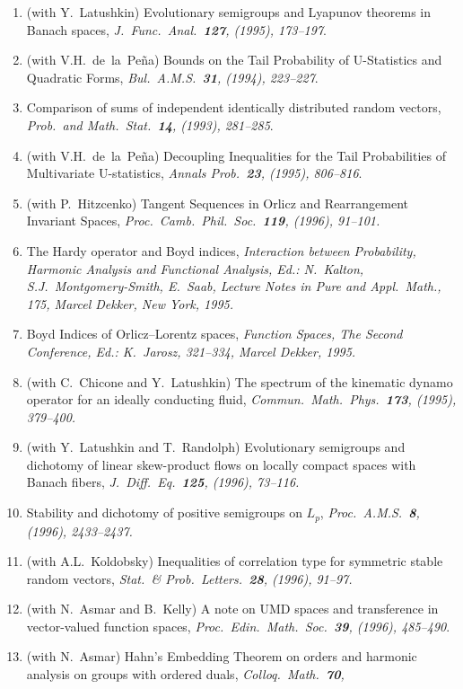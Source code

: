 \documentclass{article}
\begin{document}
\begin{enumerate}
\item (with Y.~Latushkin) Evolutionary semigroups and Lyapunov theorems
in Banach spaces, {\em J.\ Func.\ Anal.\ {\bf 127}, (1995), 173--197}.
\item (with V.H.~de~la~Pe\~na) Bounds on the Tail Probability of 
U-Statistics and Quadratic Forms, {\em Bul.\ A.M.S.\ {\bf 31}, (1994),
223--227}.
\item Comparison of sums of independent identically distributed 
random vectors, {\em Prob.\ and Math.\ Stat.\ {\bf 14}, (1993), 
281--285}.
\item (with V.H.~de~la~Pe\~na) Decoupling Inequalities for the 
Tail Probabilities of
Multivariate U-statistics, {\em Annals Prob.\ {\bf 23}, (1995), 806--816}.
\item (with P.~Hitzcenko)
Tangent Sequences in Orlicz and Rearrangement Invariant
Spaces, {\em Proc.\ Camb.\ Phil.\ Soc.\ {\bf 119}, (1996),
91--101.}
\item The Hardy operator and Boyd indices, 
{\em 
Interaction between Probability, Harmonic Analysis and Functional Analysis,
Ed.: N.~Kalton, S.J.~Montgomery-Smith, E.~Saab, 
Lecture Notes in Pure and
Appl.\ Math., 175, Marcel Dekker, New York, 1995.}
\item Boyd Indices of Orlicz--Lorentz spaces, {\em
Function Spaces, The Second Conference, Ed.: K.~Jarosz,
321--334, Marcel Dekker, 1995.}
\item (with C.~Chicone and Y.~Latushkin)
The spectrum of the kinematic dynamo operator for an ideally conducting
fluid, {\em Commun.\ Math.\ Phys.\ {\bf 173}, (1995), 379--400.}
\item (with Y.~Latushkin and T.~Randolph) 
Evolutionary semigroups and dichotomy of linear skew-product flows
on locally compact spaces with Banach fibers, {\em 
J.\ Diff.\ Eq.\ {\bf 125}, (1996), 73--116.}
\item Stability and dichotomy of positive semigroups on $L_p$, {\em
Proc.\ A.M.S.\ {\bf 8}, (1996), 2433--2437.}
\item (with A.L.~Koldobsky)
Inequalities of correlation type for symmetric stable 
random vectors, {\em Stat.\ \& Prob.\ Letters.\ {\bf 28}, (1996), 91--97.}
\item (with N.~Asmar and B.~Kelly)
A note on UMD spaces and transference in vector-valued
function spaces, {\em Proc.\ Edin.\ Math.\ Soc.\ {\bf 39}, (1996),
485--490}.
\item (with N.~Asmar) Hahn's Embedding Theorem on orders and harmonic
analysis on groups with ordered duals, {\em Colloq.\ Math.\ {\bf 70},
}
\end{enumerate}
\end{document}
